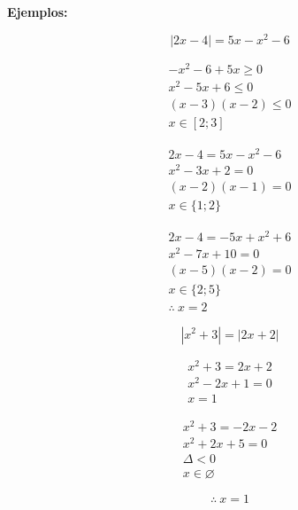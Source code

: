 \documentclass[11pt,a4paper]{article}
\begin{document}
\textbf{Ejemplos:}

\begin{minipage}[t]{0.504\textwidth}
\[|2x - 4| = 5x - x^2 - 6\]
\begin{minipage}[t]{0.5\linewidth}
\begin{gather*}
-x^2 - 6 + 5x \geq 0\\
x^2 - 5x + 6 \leq 0\\
(x-3)(x-2) \leq 0\\
x \in [2; 3]
\end{gather*}
\end{minipage}\hfill
\begin{minipage}[t]{0.5\linewidth}
\begin{gather*}
2x - 4 = 5x - x^2 - 6\\
x^2 - 3x + 2 = 0\\
(x-2)(x-1) = 0\\
x \in \{1; 2\}
\end{gather*}
\end{minipage}
\begin{gather*}
2x - 4 = -5x + x^2 + 6\\
x^2 - 7x + 10 = 0\\
(x-5)(x-2) = 0\\
x \in \{2; 5\}\\
\therefore\ x = 2
\end{gather*}
\end{minipage}\hfill
\begin{minipage}[t]{0.466\textwidth}
\[|x^2 + 3| = |2x + 2|\]
\begin{minipage}[t]{0.5\linewidth}
\begin{gather*}
x^2 + 3 = 2x + 2\\
x^2 - 2x + 1 = 0\\
x = 1
\end{gather*}
\end{minipage}\hfill
\begin{minipage}[t]{0.5\linewidth}
\begin{gather*}
x^2 + 3 = -2x - 2\\
x^2 + 2x + 5 = 0\\
\Delta < 0\\
x \in \varnothing
\end{gather*}
\end{minipage}
\[\therefore\ x = 1\]
\end{minipage}
\end{document}
